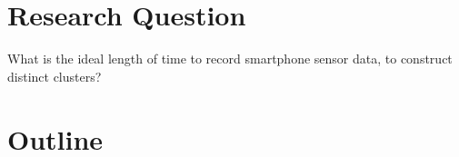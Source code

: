 \documentclass[12pt,a4paper]{article}
\begin{document}
















\section*{Research Question}
What is the ideal length of time to record smartphone sensor data, to construct distinct clusters?

\section*{Outline}
\end{document}
